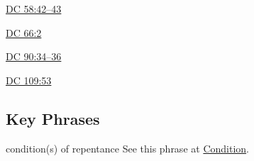		\begin{compactdesc}
			\item[{\hyperref[DC58-42]{DC 58:42--43}}]
			\item[{\hyperref[DC66-2]{DC 66:2}}]
			\item[{\hyperref[DC90-34]{DC 90:34--36}}]
			\item[{\hyperref[DC109-53]{DC 109:53}}]
		\end{compactdesc}
		
	
		
		
\subsection{Key Phrases} %
	\label{REPENTANCE-PHRASES}

	\begin{compactdesc}
		\item[condition(s) of repentance] See this phrase at \hyperref[CONDITION-PHRASES]{Condition}.
	\end{compactdesc}
	

